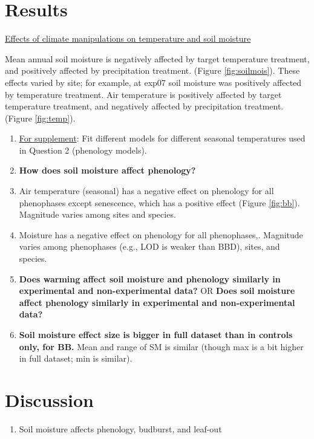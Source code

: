 \documentclass{article}
\begin{document}
\section* {Results}
\begin{singlespace}
\par \underline{Effects of climate manipulations on temperature and soil moisture}
\par Mean annual soil moisture is negatively affected by target temperature treatment, and positively affected by precipitation treatment. (Figure \ref {fig:soilmois}). These effects varied by site; for example, at exp07 soil moisture was positively affected by temperature treatment. Air temperature is positively affected by target temperature treatment, and negatively affected by precipitation treatment. (Figure \ref {fig:temp}).
\begin{enumerate}
\item \underline{For supplement}: Fit different models for different seasonal temperatures used in Question 2 (phenology models).

\item{\textbf{How does soil moisture affect phenology?}}
\item Air temperature (seasonal) has a negative effect on phenology for all phenophases except senescence, which has a positive effect (Figure \ref{fig:bb}). Magnitude varies among sites and species. 
\item Moisture has a negative effect on phenology for all phenophases,. Magnitude varies among phenophases (e.g., LOD is weaker than BBD), sites, and species.

\item {\textbf{Does warming affect soil moisture and phenology similarly in experimental and non-experimental data?}} OR {\textbf{Does soil moisture affect phenology similarly in experimental and non-experimental data?}}

\item \textbf{Soil moisture effect size is bigger in full dataset than in controls only, for BB.} Mean and range of SM is similar (though max is a bit higher in full dataset; min is similar).

\end{enumerate}

\end{singlespace}

\section* {Discussion}
\begin{enumerate}
\item Soil moisture affects phenology, budburst, and  leaf-out
\end{enumerate}
\end{document}
